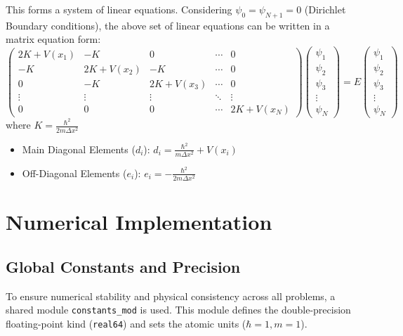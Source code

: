 \documentclass[12pt, a4paper, twoside]{article}
\newcommand{\be}{\begin{equation*}}
\newcommand{\ee}{\end{equation*}}
\begin{document}
        This forms a system of linear equations. Considering $\psi_0 = \psi_{N+1} = 0$ (Dirichlet Boundary conditions), the above set of linear equations can be written in a matrix equation form:
        \be
        \boxed{\begin{pmatrix}
        2K + V(x_1) & -K & 0 & \cdots & 0 \\
        -K & 2K + V(x_2) & -K & \cdots & 0 \\
        0 & -K & 2K + V(x_3) & \cdots & 0 \\
        \vdots & \vdots & \vdots & \ddots & \vdots \\
        0 & 0 & 0 & \cdots & 2K + V(x_N)
        \end{pmatrix}
        \begin{pmatrix}
        \psi_1 \\
        \psi_2 \\
        \psi_3 \\
        \vdots \\
        \psi_N
        \end{pmatrix}
        = E
        \begin{pmatrix}
        \psi_1 \\
        \psi_2 \\
        \psi_3 \\
        \vdots \\
        \psi_N
        \end{pmatrix}}
        \ee
        where $K = \frac{\hbar^2}{2m \Delta x^2}$
        \begin{itemize}
            \item Main Diagonal Elements ($d_i$): $d_i = \frac{\hbar^2}{m \Delta x^2} + V(x_i)$ 
            \item Off-Diagonal Elements ($e_i$): $e_i = -\frac{\hbar^2}{2m \Delta x^2}$
        \end{itemize}
        

    \section{Numerical Implementation}

        \subsection{Global Constants and Precision}
        To ensure numerical stability and physical consistency across all problems, a shared module \texttt{constants\_mod} is used. This module defines the double-precision floating-point kind (\texttt{real64}) and sets the atomic units ($\hbar = 1, m = 1$).
\end{document}
